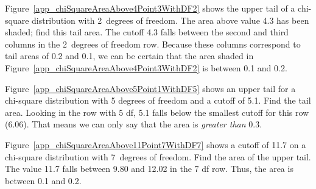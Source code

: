 \begin{examplewrap}
\begin{nexample}{
    Figure~\ref{app_chiSquareAreaAbove4Point3WithDF2}
    shows the upper tail of a chi-square distribution
    with 2~degrees of freedom.
    The area above value 4.3 has been shaded;
    find this tail area.}
  The cutoff 4.3 falls between the second and third columns
  in the 2~degrees of freedom row.
  Because these columns correspond to tail areas of 0.2 and 0.1,
  we can be certain that the area shaded in
  Figure~\ref{app_chiSquareAreaAbove4Point3WithDF2}
  is between 0.1 and 0.2.
\end{nexample}
\end{examplewrap}

\begin{examplewrap}
\begin{nexample}{Figure~\ref{app_chiSquareAreaAbove5Point1WithDF5} shows an upper tail for a chi-square distribution with 5 degrees of freedom and a cutoff of 5.1. Find the tail area.}
Looking in the row with 5 df, 5.1 falls below the smallest cutoff for this row (6.06). That means we can only say that the area is \emph{greater than} 0.3.
\end{nexample}
\end{examplewrap}

\begin{examplewrap}
\begin{nexample}{Figure~\ref{app_chiSquareAreaAbove11Point7WithDF7}
    shows a cutoff of 11.7 on a chi-square distribution with
    7~degrees of freedom.
    Find the area of the upper tail.}
  The value 11.7 falls between 9.80 and 12.02 in the 7 df row.
  Thus, the area is between 0.1 and 0.2.
\end{nexample}
\end{examplewrap}

%

